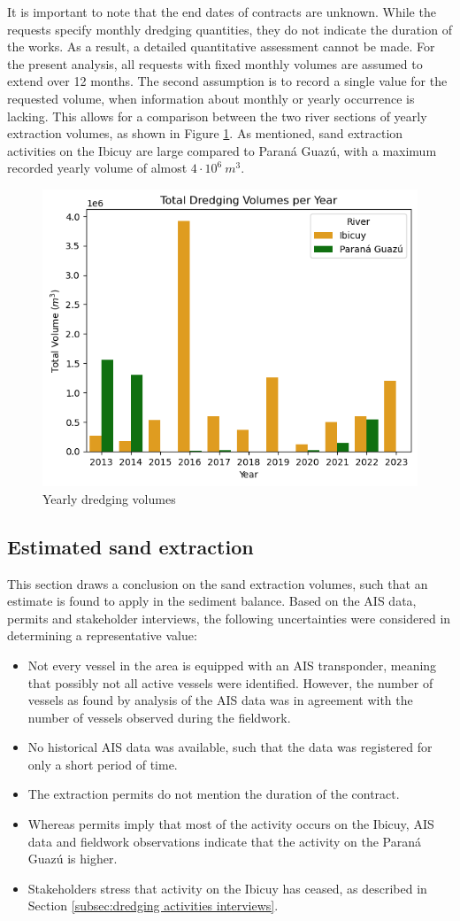 It is important to note that the end dates of contracts are unknown. While the requests specify monthly dredging quantities, they do not indicate the duration of the works. As a result, a detailed quantitative assessment cannot be made. For the present analysis, all requests with fixed monthly volumes are assumed to extend over 12 months. The second assumption is to record a single value for the requested volume, when information about monthly or yearly occurrence is lacking. This allows for a comparison between the two river sections of yearly extraction volumes, as shown in Figure \ref{fig:yearly dredging volumes}. As mentioned, sand extraction activities on the Ibicuy are large compared to Paraná Guazú, with a maximum recorded yearly volume of almost $4 \cdot 10^6 ~m^3$.  

\begin{figure}[H]
    \centering
    \includegraphics[width=0.50\linewidth]{figures/ch2/Dredging volumes permits.png}
    \caption{Yearly dredging volumes}
    \label{fig:yearly dredging volumes}
\end{figure}

\subsection{Estimated sand extraction}
This section draws a conclusion on the sand extraction volumes, such that an estimate is found to apply in the sediment balance. Based on the AIS data, permits and stakeholder interviews, the following uncertainties were considered in determining a representative value:

\begin{itemize}
    \item Not every vessel in the area is equipped with an AIS transponder, meaning that possibly not all active vessels were identified. However, the number of vessels as found by analysis of the AIS data was in agreement with the number of vessels observed during the fieldwork.
    \item No historical AIS data was available, such that the data was registered for only a short period of time.
    \item The extraction permits do not mention the duration of the contract.
    \item Whereas permits imply that most of the activity occurs on the Ibicuy, AIS data and fieldwork observations indicate that the activity on the Paraná Guazú is higher. 
    \item Stakeholders stress that activity on the Ibicuy has ceased, as described in Section \ref{subsec:dredging activities interviews}.
\end{itemize}

